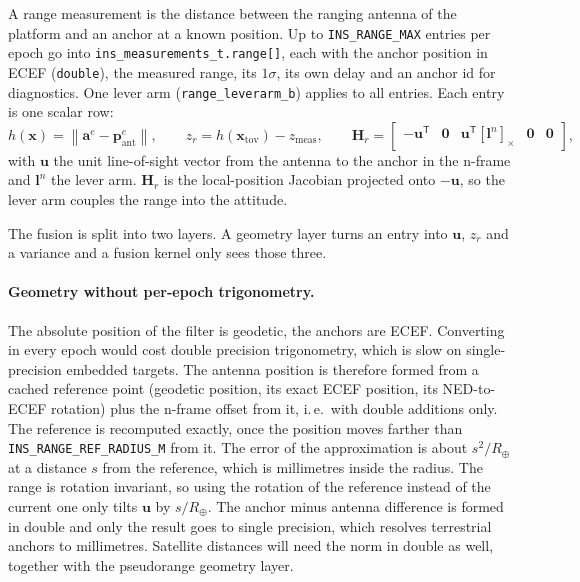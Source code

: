 \documentclass[11pt,a4paper]{article}
\newcommand{\vect}[1]{\bm{#1}}
\newcommand{\mat}[1]{\bm{#1}}
\newcommand{\T}{^{\mathsf{T}}}
\newcommand{\cross}[1]{\left[#1\right]_{\times}}   %
\newcommand{\nframe}{n}
\newcommand{\eframe}{e}
\newcommand{\code}[1]{\texttt{#1}}
\begin{document}
A range measurement is the distance between the ranging antenna of the
platform and an anchor at a known position. Up to
\code{INS\_\allowbreak{}RANGE\_\allowbreak{}MAX} entries per epoch go into
\code{ins\_\allowbreak{}measurements\_\allowbreak{}t.range[]}, each with the
anchor position in ECEF (\code{double}), the measured range, its $1\sigma$, its
own delay and an anchor id for diagnostics. One lever arm
(\code{range\_\allowbreak{}leverarm\_\allowbreak{}b}) applies to all entries.
Each entry is one scalar row:
\begin{equation}
  h(\vect{x}) = \left\lVert \vect{a}^\eframe - \vect{p}^\eframe_{\text{ant}} \right\rVert ,
  \qquad
  z_r = h(\vect{x}_{\text{tov}}) - z_{\text{meas}} ,
  \qquad
  \mat{H}_r =
  \begin{bmatrix}
    -\vect{u}\T & \mat{0} & \vect{u}\T \cross{\vect{l}^\nframe} & \mat{0} & \mat{0}
  \end{bmatrix},
\end{equation}
with $\vect{u}$ the unit line-of-sight vector from the antenna to the anchor in
the n-frame and $\vect{l}^\nframe$ the lever arm. $\mat{H}_r$ is the
local-position Jacobian projected onto $-\vect{u}$, so the lever arm couples the
range into the attitude.

The fusion is split into two layers. A geometry layer turns an entry into
$\vect{u}$, $z_r$ and a variance and a fusion kernel only sees those three.

\paragraph{Geometry without per-epoch trigonometry.} The absolute position of
the filter is geodetic, the anchors are ECEF. Converting in every epoch would
cost double precision trigonometry, which is slow on single-precision embedded
targets. The antenna position is therefore formed from a cached reference
point (geodetic position, its exact ECEF position, its NED-to-ECEF rotation)
plus the n-frame offset from it, i.\,e.\ with double additions only. The
reference is recomputed exactly, once the position moves farther than
\code{INS\_\allowbreak{}RANGE\_\allowbreak{}REF\_\allowbreak{}RADIUS\_\allowbreak{}M}
from it. The error of the approximation is about $s^2/R_\oplus$ at a distance
$s$ from the reference, which is millimetres inside the radius. The range is
rotation invariant, so using the rotation of the reference instead of the
current one only tilts $\vect{u}$ by $s/R_\oplus$. The anchor minus antenna
difference is formed in double and only the result goes to single precision,
which resolves terrestrial anchors to millimetres. Satellite distances will need
the norm in double as well, together with the pseudorange geometry layer.
\end{document}
